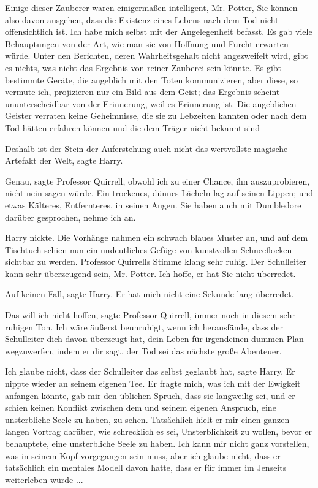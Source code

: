 \glqq{}Einige dieser Zauberer waren einigermaßen intelligent, Mr. Potter, Sie
können also davon ausgehen, dass die Existenz eines Lebens nach dem Tod nicht
offensichtlich ist. Ich habe mich selbst mit der Angelegenheit befasst. Es gab
viele Behauptungen von der Art, wie man sie von Hoffnung und Furcht erwarten
würde. Unter den Berichten, deren Wahrheitsgehalt nicht angezweifelt wird, gibt
es nichts, was nicht das Ergebnis von reiner Zauberei sein könnte. Es gibt
bestimmte Geräte, die angeblich mit den Toten kommunizieren, aber diese, so
vermute ich, projizieren nur ein Bild aus dem Geist; das Ergebnis scheint
ununterscheidbar von der Erinnerung, weil es Erinnerung ist. Die angeblichen
Geister verraten keine Geheimnisse, die sie zu Lebzeiten kannten oder nach dem
Tod hätten erfahren können und die dem Träger nicht bekannt sind -\grqq{}

\glqq{}Deshalb ist der Stein der Auferstehung auch nicht das wertvollste magische
Artefakt der Welt\grqq{}, sagte Harry.

\glqq{}Genau\grqq{}, sagte Professor Quirrell, \glqq{}obwohl ich zu einer Chance,
ihn auszuprobieren, nicht nein sagen würde.\grqq{} Ein trockenes, dünnes Lächeln lag
auf seinen Lippen; und etwas Kälteres, Entfernteres, in seinen Augen. \glqq{}Sie
haben auch mit Dumbledore darüber gesprochen, nehme ich an.\grqq{}

Harry nickte. Die Vorhänge nahmen ein schwach blaues Muster an, und auf dem
Tischtuch schien nun ein undeutliches Gefüge von kunstvollen Schneeflocken
sichtbar zu werden. Professor Quirrells Stimme klang sehr ruhig. \glqq{}Der
Schulleiter kann sehr überzeugend sein, Mr. Potter. Ich hoffe, er hat Sie nicht
überredet.\grqq{}

\glqq{}Auf keinen Fall\grqq{}, sagte Harry. \glqq{}Er hat mich nicht eine Sekunde
lang überredet.\grqq{}

\glqq{}Das will ich nicht hoffen\grqq{}, sagte Professor Quirrell, immer noch in
diesem sehr ruhigen Ton. \glqq{}Ich wäre äußerst beunruhigt, wenn ich
herausfände, dass der Schulleiter dich davon überzeugt hat, dein Leben für
irgendeinen dummen Plan wegzuwerfen, indem er dir sagt, der Tod sei das nächste
große Abenteuer.\grqq{}

\glqq{}Ich glaube nicht, dass der Schulleiter das selbst geglaubt hat\grqq{},
sagte Harry. Er nippte wieder an seinem eigenen Tee. \glqq{}Er fragte mich, was
ich mit der Ewigkeit anfangen könnte, gab mir den üblichen Spruch, dass sie
langweilig sei, und er schien keinen Konflikt zwischen dem und seinem eigenen
Anspruch, eine unsterbliche Seele zu haben, zu sehen. Tatsächlich hielt er mir
einen ganzen langen Vortrag darüber, wie schrecklich es sei, Unsterblichkeit zu
wollen, bevor er behauptete, eine unsterbliche Seele zu haben. Ich kann mir
nicht ganz vorstellen, was in seinem Kopf vorgegangen sein muss, aber ich glaube
nicht, dass er tatsächlich ein mentales Modell davon hatte, dass er für immer im
Jenseits weiterleben würde ...\grqq{}

